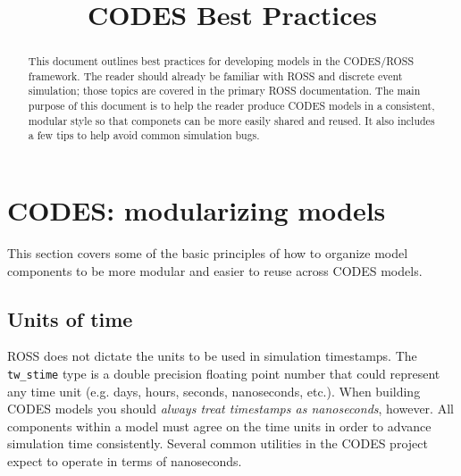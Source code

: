 \documentclass[conference,10pt,compsocconf,onecolumn]{IEEEtran}
\begin{document}
\title{CODES Best Practices}





\renewcommand{\thetable}{\arabic{table}}

\maketitle

\begin{abstract}
This document outlines best practices for developing models in the
CODES/ROSS framework.  The reader should already be familiar with ROSS
and discrete event simulation; those topics are covered in the primary
ROSS documentation.
%
The main purpose of this document is to help the reader produce
CODES models in a consistent, modular style so that componets can be more
easily shared and reused.  It also includes a few tips to help avoid common
simulation bugs.
\end{abstract}

\section{CODES: modularizing models}

This section covers some of the basic principles of how to organize model
components to be more modular and easier to reuse across CODES models.

\subsection{Units of time}

ROSS does not dictate the units to be used in simulation timestamps.
The \texttt{tw\_stime} type is a double precision
floating point number that could represent any time unit
(e.g. days, hours, seconds, nanoseconds, etc.).  When building CODES
models you should \emph{always treat timestamps as nanoseconds}, however.
All components within a model must agree on the time units in order to
advance simulation time consistently.  Several common utilities in the
CODES project expect to operate in terms of nanoseconds.
\end{document}

